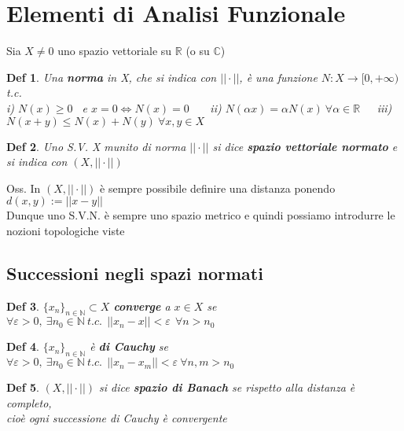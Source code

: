 \documentclass{article}
\theoremstyle{unnumbered}
\newtheorem* {theoremT}{Def}
\theoremstyle{unnumbered1}
\newenvironment{defi}{\begin{gBox}\begin{theoremT}}{\end{theoremT}\end{gBox}}
\begin{document}
\newpage



\section{Elementi di Analisi Funzionale}   


Sia $X\neq0$ uno spazio vettoriale su $\mathbb{R}$ (o su $\mathbb{C}$)
\begin{defi}
Una \textbf{norma} in X, che si indica con $||\cdot ||$, è una funzione $N:X\rightarrow [0,+\infty)$ t.c.\\
i) $N(x)\ge 0$  \ e $x=0\Leftrightarrow N(x)=0$ \ \ \ ii) $N(\alpha x)=\alpha N(x) \ \forall \alpha \in \mathbb{R}$\ \ \ iii) $N(x+y)\le N(x)+N(y) \ \forall x,y \in X$
\end{defi}

\begin{defi}
Uno S.V. X munito di norma $||\cdot||$ si dice \textbf{spazio vettoriale normato} e si indica con $(X,||\cdot||)$
\end{defi}
%
Oss. In $(X,||\cdot||)$ è sempre possibile definire una distanza ponendo $d(x,y):=||x-y||$\\
Dunque uno S.V.N. è sempre uno spazio metrico e quindi possiamo introdurre le nozioni topologiche viste\\


\subsection{Successioni negli spazi normati}

\begin{defi}
$\{x_n\}_{n\in\mathbb{N}}\subset X$ \textbf{converge} a $x\in X$ se \ \ $\forall\varepsilon>0,\ \exists n_0\in\mathbb{N} \ t.c. \ \ ||x_n-x||<\varepsilon \ \ \forall n>n_0$
\end{defi}

\begin{defi}
$\{x_n\}_{n\in\mathbb{N}}$ è \textbf{di Cauchy} se \ \ $\forall \varepsilon>0, \ \exists n_0\in\mathbb{N} \ t.c. \ \ ||x_n-x_m||<\varepsilon \ \forall n,m >n_0$
\end{defi}

\begin{defi}
$(X,||\cdot||)$ si dice \textbf{spazio di Banach} se rispetto alla distanza è completo,\\ cioè ogni successione di Cauchy è convergente
\end{defi}
\vspace{0.27cm}
%
%
\end{document}
